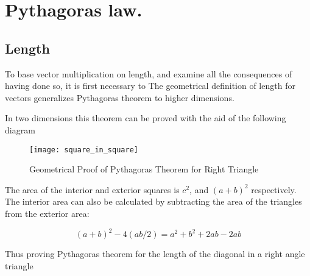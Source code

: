 
%



%
%

\chapter{Pythagoras law.}
\label{chap:pythagoras}
\date{ March 17, 2008.  pythagoras.tex }



\section{Length}

To base vector multiplication on length, and examine all the consequences of having done so, it is first necessary to 
The geometrical definition of length for vectors generalizes Pythagoras theorem to higher dimensions.

In two dimensions this theorem can be proved with the aid of the following diagram

\begin{figure}[htp]
\centering
\texttt{[image: square\_in\_square]}
\caption{Geometrical Proof of Pythagoras Theorem for Right Triangle}\label{fig:phthagoras}
\end{figure}

The area of the interior and exterior squares is $c^2$, and $(a+b)^2$ respectively.  The interior area can also be calculated by subtracting the area of the triangles from the exterior area:

\[
(a+b)^2 - 4(ab/2) = a^2 + b^2 + 2ab - 2ab
\]

Thus proving Pythagoras theorem for the length of the diagonal in a right angle triangle


